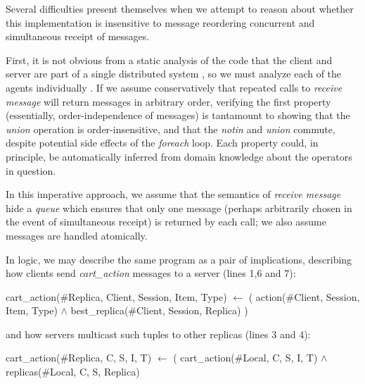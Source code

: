 Several difficulties present themselves when we attempt to reason about whether
this implementation is insensitive to message reordering concurrent and simultaneous receipt of messages.  

First, it is not obvious from a static analysis of the code that the client and server are
part of a single distributed system , so we must analyze each of the agents individually . 
If we assume conservatively that repeated calls to {\em receive message} will return messages in
arbitrary order, verifying the first property (essentially, order-independence of messages)
is tantamount to showing that the {\em union} operation is
order-insensitive, and that the {\em notin} and {\em union} commute, despite potential
side effects of the {\em foreach} loop.  Each property could, in principle, be automatically inferred
from domain knowledge about the operators in question.

In this imperative approach, we assume that the semantics of {\em receive message}
hide a {\em queue} which ensures that only one message (perhaps arbitrarily chosen in the
event of simultaneous receipt) is returned by each call; we also assume messages are handled atomically. 


In logic, we may describe the same program
as a pair of implications, describing how clients send {\em cart\_action}
messages to a server (lines 1,6 and 7):

\begin{Dedalus}
cart\_action(#Replica, Client, Session, Item, Type)
  \(\leftarrow\) ( action(#Client, Session, Item, Type) \(\land\)
       best_replica(#Client, Session, Replica) )
\end{Dedalus}

\noindent and how servers multicast such tuples to other replicas (lines 3 and 4):

\begin{Dedalus}
cart\_action(#Replica, C, S, I, T)
  \(\leftarrow\) ( cart\_action(#Local, C, S, I, T) \(\land\)
       replicas(#Local, C, S, Replica)
\end{Dedalus}

